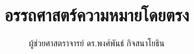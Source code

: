 \documentclass[12pt]{book}
\begin{document}
\title{\textbf{อรรถศาสตร์ความหมายโดยตรง}}
\author{ผู้ช่วยศาสตราจารย์ ดร.พงศ์พันธ์ กิจสนาโยธิน}




\end{document}
